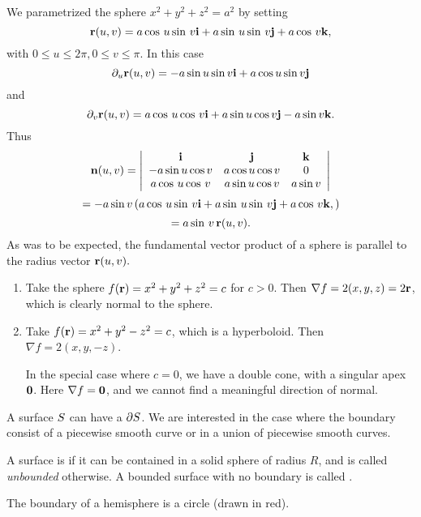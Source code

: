\begin{exa}
We parametrized the sphere $x^2+y^2+z^2=a^2$ by setting
\[
\mathbf{ r}(u,v)=a\cos \,u\sin \,v\mathbf{ i}+a\sin \,u\sin \,v\mathbf{ j}+a\cos \,v\mathbf{ k},
\]
with $0\le u\le 2\pi ,0\le v\le \pi .$ In this case
\[
\partial_u \mathbf{ r}(u,v)=-a\sin u\sin v\mathbf{ i}+a\cos u\sin v\mathbf{ j}
\]
and
\[
\partial_v \mathbf{ r}(u,v)=a\cos \,u\cos \,v\mathbf{ i}+a\sin u\cos v\mathbf{ j}-a\sin v\mathbf{ k}.
\]
Thus
\[
 \mathbf{ n}(u,v)=\left|
\begin{array}{ccc}
\mathbf{ i} & \mathbf{ j} & \mathbf{ k} \\
-a\sin u\cos v & a\cos u\cos v & 0 \\
a\cos \,u\cos \,v & a\sin u\cos v & a\sin v
\end{array}
\right|
\]
\[
=-a \sin v  \left(  a\cos \,u\sin \,v\mathbf{ i}+a\sin \,u\sin \,v\mathbf{ j}+a\cos \,v\mathbf{ k},   \right) \]
\[
=a\sin \,v\,\mathbf{ r}(u,v).
\]
As was to be expected, the fundamental vector product of a sphere is
parallel to the radius vector $\mathbf{ r}(u,v).$


\begin{exa}\leavevmode
  \begin{enumerate}
    \item Take the sphere $f(\mathbf{ r}) = x^2 + y^2 + z^2 = c$ for $c > 0$. Then $\nabla f = 2(x, y, z) = 2\mathbf{ r}$, which is clearly normal to the sphere.
    \item Take $f(\mathbf{ r}) = x^2 + y^2 - z^2 = c$, which is a hyperboloid. Then $\nabla f = 2(x, y, -z)$.

      In the special case where $c = 0$, we have a double cone, with a singular apex $\mathbf{ 0}$. Here $\nabla f = \mathbf{ 0}$, and we cannot find a meaningful direction of normal.
  \end{enumerate}
\end{exa}

\begin{definition}[Boundary]
  A surface $S$ can have a  $\partial S$. We are interested in the case where the boundary  consist of a piecewise smooth curve or in a union of piecewise smooth curves. 

  A surface is  if it can be contained in a solid sphere of radius $R$, and is called  \emph{unbounded} otherwise. A bounded surface with no boundary is called .
\end{definition}


\begin{exa}
  The boundary of a hemisphere is a circle (drawn in red).
\leavevmode
  \begin{center}
  \end{center}
\end{exa}


\end{exa}
